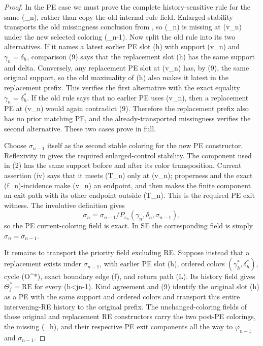 \begin{proof}
In the PE case we must prove the complete history-sensitive rule for the
same (\gamma_n), rather than copy the old internal rule field.  Enlarged
stability transports the old missingness conclusion from
, so (\gamma_n) is missing at (v_n)
under the new selected coloring (\sigma_{n-1}).  Now split the old rule
into its two alternatives.  If it names a latest earlier PE slot (h) with
support (v_n) and \(\gamma_n=\delta_h\), comparison (9) says that the
replacement slot (h) has the same support and delta.  Conversely, any
replacement PE slot at (v_n) has, by (9), the same original support, so
the old maximality of (h) also makes it latest in the replacement prefix.
This verifies the first alternative with the exact equality
\(\gamma_n=\delta_h^*\).  If the old rule says that no earlier PE uses
(v_n), then a replacement PE at (v_n) would again contradict (9).
Therefore the replacement prefix also has no prior matching PE, and the
already-transported missingness verifies the second alternative.  These
two cases prove  in full.

Choose \(\sigma_{n-1}\) itself as the second stable coloring for the new
PE constructor.  Reflexivity in  gives the required
enlarged-control stability.  The component used in (2) has the same
support before and after its color transposition.  Current assertion (iv)
says that it meets
(T_n) only at (v_n); properness and the exact (f_n)-incidence make
(v_n) an endpoint, and 
then makes the finite component an exit path with its other endpoint
outside (T_n).  This is the required PE exit witness.  The involutive
definition  gives
\[
 \sigma_n=\sigma_{n-1}/P_{v_n}
                  (\gamma_n,\delta_n,\sigma_{n-1}),           \tag{12}
\]
so the PE current-coloring field is exact.  In SE the corresponding field
is simply \(\sigma_n=\sigma_{n-1}\).

It remains to transport the priority field excluding RE.  Suppose instead
that a replacement  exists under
\(\sigma_{n-1}\), with earlier PE slot (h), ordered colors
\((\gamma_h^*,\delta_h^*)\), cycle (O^*), exact boundary edge (f), and
return path (L).  Its history field gives
\(\Theta_j^*=\mathrm{RE}\) for every (h<j\leq n-1).  Kind agreement and
(9) identify the original slot (h) as a PE with the same support and
ordered colors and transport this entire intervening-RE history to the
original prefix.  The unchanged-coloring fields of those original and
replacement RE constructors carry the two post-PE colorings, the missing
(\delta_h), and their respective PE exit components all the way to
\(\varphi_{n-1}\) and \(\sigma_{n-1}\).


\end{proof}
